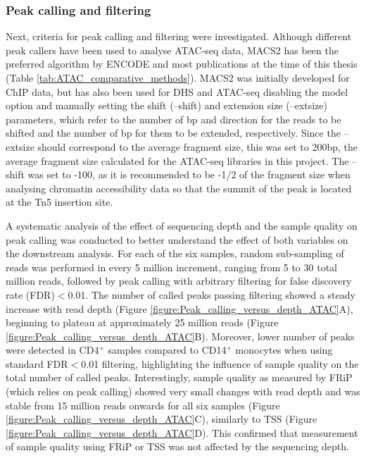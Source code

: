 \subsubsection{Peak calling and filtering}
\label{peak_filtering}
Next, criteria for peak calling and filtering were investigated. Although different peak callers have been used to analyse ATAC-seq data, MACS2 has been the preferred algorithm by ENCODE and most publications at the time of this thesis (Table \ref{tab:ATAC_comparative_methods}). MACS2 was initially developed for ChIP data, but has also been used for DHS and ATAC-seq disabling the model option and manually setting the shift (--shift) and extension size (--extsize) parameters, which refer to the number of bp and direction for the reads to be shifted and the number of bp for them to be extended, respectively. Since the --extsize should correspond to the average fragment size, this was set to 200bp, the average fragment size calculated for the ATAC-seq libraries in this project. The --shift was set to -100, as it is recommended to be -1/2 of the fragment size when analysing chromatin accessibility data so that the summit of the peak is located at the Tn5 insertion site. 

A systematic analysis of the effect of sequencing depth and the sample quality on peak calling was conducted to better understand the effect of both variables on the downstream analysis. For each of the six samples, random sub-sampling of reads was performed in every 5 million increment, ranging from 5 to 30 total million reads, followed by peak calling with arbitrary filtering for false discovery rate (FDR)$<$0.01. The number of called peaks passing filtering showed a steady increase with read depth  (Figure \ref{figure:Peak_calling_versus_depth_ATAC}A), beginning to plateau at approximately 25 million reads (Figure \ref{figure:Peak_calling_versus_depth_ATAC}B). Moreover, lower number of peaks were detected in CD4$^+$ samples compared to CD14$^+$ monocytes when using standard  FDR$<$0.01 filtering, highlighting the influence of sample quality on the total number of called peaks. Interestingly, sample quality as measured by FRiP (which relies on peak calling) showed very small changes with read depth and was stable from 15 million reads onwards for all six samples (Figure \ref{figure:Peak_calling_versus_depth_ATAC}C), similarly to TSS (Figure \ref{figure:Peak_calling_versus_depth_ATAC}D). This confirmed that measurement of sample quality using FRiP or TSS was not affected by the sequencing depth.


